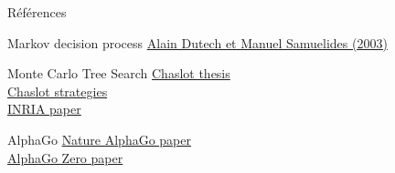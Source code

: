 \begin{frame}{Références}
    \begin{block}{Markov decision process}
        \href{https://members.loria.fr/ADutech/Papier/dutech_selectifPOMDP_RIA03.pdf}{Alain Dutech et Manuel Samuelides (2003)}
    \end{block}
    \begin{block}{Monte Carlo Tree Search}
        \href{https://project.dke.maastrichtuniversity.nl/games/files/phd/Chaslot_thesis.pdf}{Chaslot thesis}\\
        \href{https://helios2.mi.parisdescartes.fr/~bouzy/publications/Chaslot-MCStrategiesComputerGo-BNAIC06.pdf}{Chaslot strategies}\\
        \href{https://hal.inria.fr/inria-00116992/document}{INRIA paper}
    \end{block}
    \begin{block}{AlphaGo}
        \href{https://www.nature.com/articles/nature16961#citeas}{Nature AlphaGo paper}\\
        \href{https://arxiv.org/abs/1712.01815}{AlphaGo Zero paper}
    \end{block}
\end{frame}